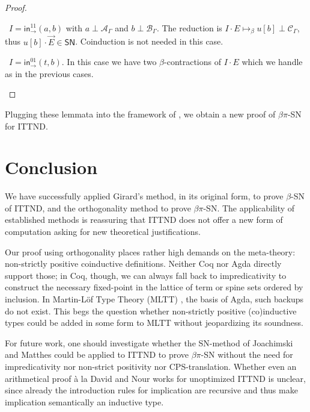 \documentclass[a4paper,USenglish,cleveref, autoref, thm-restate]{lipics-v2019}
\newenvironment{caselist}{%
  \begin{list}{{\it Case}}{%
  }%
}{\end{list}%
}
\newcommand{\nextcase}{\item~}
\newcommand{\tin}{\ensuremath{\mathsf{in}}}
\newcommand{\inn}[2]{\ensuremath{\tin_{#1}^{#2}}}
\newcommand{\contract}[1][]{\mapsto_{#1}}
\newcommand{\A}{\mathcal{A}}
\newcommand{\B}{\mathcal{B}}
\newcommand{\C}{\mathcal{C}}
\newcommand{\SN}{\mathsf{SN}}
\begin{document}
\begin{proof}
\begin{caselist}
    \nextcase $I = \inn\to{11}(a,b)$ with $a \perp \A_\Gamma$ and
    $b \perp \B_\Gamma$.
    The reduction is
    $I \cdot E \contract[\beta] u[b] \perp \C_\Gamma$, thus $u[b]
    \cdot \vec E \in \SN$.
    Coinduction is not needed in this case.

    \nextcase $I = \inn\to{01}(t,b)$.  In this case we have two
      $\beta$-contractions of $I \cdot E$ which we handle as in the
      previous cases.
  \popQED
  \end{caselist}
\end{proof}

Plugging these lemmata into the framework of , we
obtain a new proof of $\beta\pi$-SN for ITTND.

\section{Conclusion}
\label{sec:concl}

We have successfully applied Girard's method, in its original form, to
prove $\beta$-SN of ITTND, and the orthogonality method to prove
$\beta\pi$-SN.  The applicability of established methods is reassuring
that ITTND does not offer a new form of computation asking for new
theoretical justifications.

Our proof using orthogonality places rather high demands on the
meta-theory: non-strictly positive coinductive definitions.  Neither
Coq nor Agda directly support those; in Coq, though, we can always
fall back to impredicativity to construct the necessary fixed-point in
the lattice of term or spine sets ordered by inclusion.  In
Martin-L\"of Type Theory (MLTT) \cite{MartinLoef84}, the basis of
Agda, such backups do not exist.  This begs the question whether
non-strictly positive (co)inductive types could be added in some form
to MLTT without jeopardizing its soundness.

For future work, one should investigate whether the SN-method of
Joachimski and Matthes \cite{matthes:shortproofs} could be applied to
ITTND to prove $\beta\pi$-SN without the need for impredicativity nor
non-strict positivity nor CPS-translation.  Whether even an
arithmetical proof \`a la David and Nour
\cite{david:normWithoutRed,davidNour:tlca05} works for unoptimized
ITTND is unclear, since already the introduction rules for implication
are recursive and thus make implication semantically an inductive type.
\end{document}
